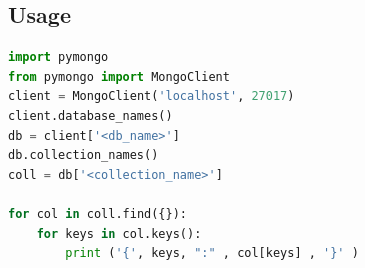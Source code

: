\documentclass[12pt, a4paper, portrait]{article}
\begin{document}
\subsection{Usage}
\begin{lstlisting}[language=Python]
import pymongo
from pymongo import MongoClient
client = MongoClient('localhost', 27017)
client.database_names()
db = client['<db_name>']
db.collection_names()
coll = db['<collection_name>']

for col in coll.find({}):
    for keys in col.keys(): 
        print ('{', keys, ":" , col[keys] , '}' )
        
\end{lstlisting}
\end{document}
